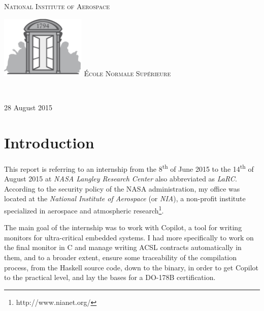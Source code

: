 \documentclass[a4paper,11pt,final]{article}
\begin{document}
\begin{titlepage}
\begin{center}
\begin{minipage}[t]{0.25\textwidth}
\begin{flushleft}
					\textsc{\LARGE National Institute of Aerospace}
				\end{flushleft}
			\end{minipage}
			\begin{minipage}[t]{0.25\textwidth}
				\begin{flushleft}
					\includegraphics[height=30mm]{images/ENS-logo.jpg}
					\textsc{\LARGE École Normale Supérieure}
				\end{flushleft}
			\end{minipage} \\[1.5cm]
			\vfill
			
			{\large 28 August 2015}
			
		\end{center}
		
	\end{titlepage}
	
	
	\cleardoublepage %
	\section*{Introduction}
	This report is referring to an internship from the 8\textsuperscript{th} of June 2015 to the 14\textsuperscript{th} of August 2015 at \emph{NASA Langley Research Center} also abbreviated as \emph{LaRC}. According to the security policy of the NASA administration, my office was located at the \emph{National Institute of Aerospace} (or \emph{NIA}), a non-profit institute specialized in aerospace and atmospheric research\footnote{http://www.nianet.org/}. 
	
	The main goal of the internship was to work with Copilot, a tool for writing monitors for ultra-critical embedded systems. I had more specifically to work on the final monitor in C and manage writing ACSL contracts automatically in them, and to a broader extent, ensure some traceability of the compilation process, from the Haskell source code, down to the binary, in order to get Copilot to the practical level, and lay the bases for a DO-178B certification.
	
	\tableofcontents %
	\sloppy          %
	
\end{document}
